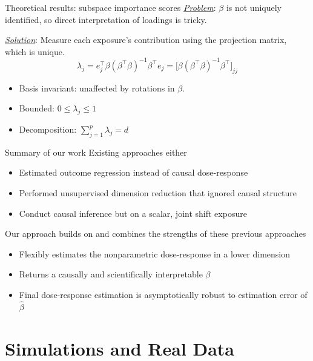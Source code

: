 \documentclass[
  ignorenonframetext,
  aspectratio=169,
  11pt]{beamer}
\providecommand{\tightlist}{%
  \setlength{\itemsep}{0pt}\setlength{\parskip}{0pt}}
\begin{document}
\begin{frame}{Theoretical results: subspace importance scores}
\protect{}\label{theoretical-results-subspace-importance-scores}
\underline{\textit{Problem}}: \(\beta\) is not uniquely identified, so
direct interpretation of loadings is tricky.

\underline{\textit{Solution}}: Measure each exposure's contribution
using the projection matrix, which is unique. \[
\boxed{\lambda_j = e_j^\top \beta(\beta^\top \beta)^{-1}\beta^\top e_j=\big[\beta(\beta^\top \beta)^{-1}\beta^\top\big]_{jj}}
\]

\begin{itemize}
\tightlist
\item
  Basis invariant: unaffected by rotations in \(\beta\).
\item
  Bounded: \(0\leq\lambda_j\leq 1\)
\item
  Decomposition: \(\sum_{j=1}^p\lambda_j=d\)
\end{itemize}
\end{frame}

\begin{frame}{Summary of our work}
\protect{}\label{summary-of-our-work}
Existing approaches either

\begin{itemize}
\tightlist
\item
  Estimated outcome regression instead of causal dose-response
\item
  Performed unsupervised dimension reduction that ignored causal
  structure
\item
  Conduct causal inference but on a scalar, joint shift exposure
\end{itemize}

\pause

Our approach builds on and combines the strengths of these previous
approaches

\begin{itemize}
\tightlist
\item
  Flexibly estimates the nonparametric dose-response in a lower
  dimension
\item
  Returns a causally and scientifically interpretable \(\beta\)
\item
  Final dose-response estimation is asymptotically robust to estimation
  error of \(\hat{\beta}\)
\end{itemize}
\end{frame}

\section{Simulations and Real Data}\label{simulations-and-real-data}
\end{document}
